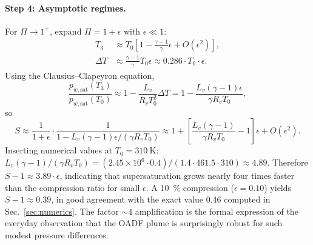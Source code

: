 \documentclass[11pt,a4paper]{article}
\newcommand{\pwsat}{p_{w,\text{sat}}}
\theoremstyle{definition}
\theoremstyle{plain}
\begin{document}
\paragraph{Step 4: Asymptotic regimes.}
For $\Pi \to 1^+$, expand $\Pi = 1 + \epsilon$ with $\epsilon \ll 1$:
\begin{align*}
T_3 &\approx T_0\left[1 - \frac{\gamma-1}{\gamma}\epsilon + O(\epsilon^2)\right], \\
\Delta T &\approx \frac{\gamma-1}{\gamma} T_0 \epsilon \approx 0.286 \cdot T_0 \cdot \epsilon.
\end{align*}
Using the Clausius–Clapeyron equation,
\begin{equation*}
\frac{\pwsat(T_3)}{\pwsat(T_0)} \approx 1 - \frac{L_v}{R_v T_0^2}\Delta T = 1 - \frac{L_v(\gamma-1)\epsilon}{\gamma R_v T_0},
\end{equation*}
so
\begin{equation*}
S \approx \frac{1}{1+\epsilon} \cdot \frac{1}{1 - L_v(\gamma-1)\epsilon/(\gamma R_v T_0)} \approx 1 + \left[\frac{L_v(\gamma-1)}{\gamma R_v T_0} - 1\right]\epsilon + O(\epsilon^2).
\end{equation*}
Inserting numerical values at $T_0 = \SI{310}{\kelvin}$: $L_v(\gamma-1)/(\gamma R_v T_0) = (2.45\times10^6 \cdot 0.4)/(1.4 \cdot 461.5 \cdot 310) \approx 4.89$.
Therefore $S - 1 \approx 3.89 \cdot \epsilon$, indicating that supersaturation grows nearly four times faster than the compression ratio for small $\epsilon$. A \SI{10}{\percent} compression ($\epsilon = 0.10$) yields $S - 1 \approx 0.39$, in good agreement with the exact value $0.46$ computed in Sec.~\ref{sec:numerics}. The factor $\sim 4$ amplification is the formal expression of the everyday observation that the OADF plume is surprisingly robust for such modest pressure differences.
\end{document}

